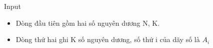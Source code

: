 Input
\begin{itemize}
	\item Dòng đầu tiên gồm hai số nguyên dương N, K.
	\item Dòng thứ hai ghi K số nguyên dương, số thứ i của dãy số là $A_{i}$
\end{itemize}